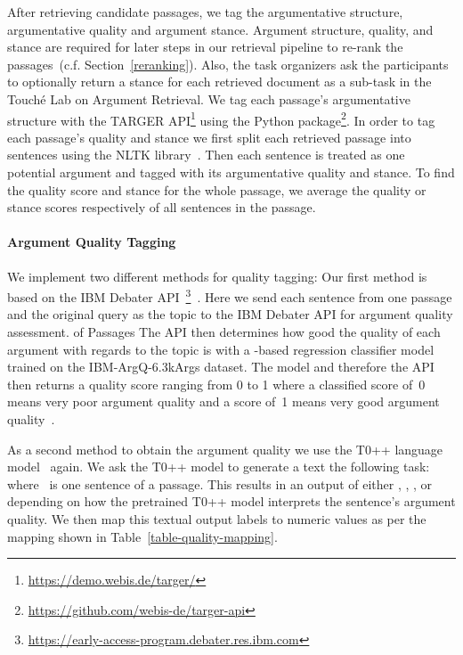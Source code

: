 After retrieving candidate passages, we tag the argumentative structure, argumentative quality and argument stance.
Argument structure, quality, and stance are required for later steps in our retrieval pipeline to re-rank the passages~(c.f. Section~\ref{reranking}).
Also, the task organizers ask the participants to optionally return a stance for each retrieved document as a sub-task in the Touché Lab on Argument Retrieval.
We tag each passage's argumentative structure with the TARGER API\footnote{\url{https://demo.webis.de/targer/}} using the  Python package\footnote{\url{https://github.com/webis-de/targer-api}}.
In order to tag each passage's quality and stance we first split each retrieved passage into sentences using the NLTK library~\cite{BirdLK2009}.
Then each sentence is treated as one potential argument and tagged with its argumentative quality and stance.
To find the quality score and stance for the whole passage, we average the quality or stance scores respectively of all sentences in the passage.

\paragraph{Argument Quality Tagging}


We implement two different methods for quality tagging:
Our first method is based on the IBM Debater API~\footnote{\url{https://early-access-program.debater.res.ibm.com}}~\cite{ToledoGCFVLJAS2019}.
Here we send each sentence from one passage and the original query as the topic to the IBM Debater API for argument quality assessment. of Passages
The API then determines how good the quality of each argument with regards to the topic is with a \Bert-based regression classifier model trained on the IBM-ArgQ-6.3kArgs dataset. The model and therefore the API then returns a quality score ranging from 0 to 1 where a classified score of~0 means very poor argument quality and a score of~1 means very good argument quality~\cite{ToledoGCFVLJAS2019}.

As a second method to obtain the argument quality we use the T0++ language model~\cite{SanhWRBSACSLRDBXTSSKCNDCJWMSYPBWNRSSFFTBGBWR2021} again.
We ask the T0++ model to generate a text the following task:  where ~is one sentence of a passage.
This results in an output of either , , , or  depending on how the pretrained T0++ model interprets the sentence's argument quality.
We then map this textual output labels to numeric values as per the mapping shown in Table~\ref{table-quality-mapping}.

